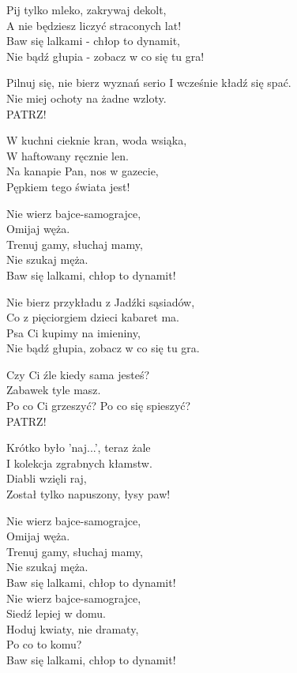 \begin{text}
    Pij tylko mleko, zakrywaj dekolt,\\
    A nie będziesz liczyć straconych lat!\\
    Baw się lalkami - chłop to dynamit,\\
    Nie bądź głupia - zobacz w co się tu gra!

    Pilnuj się, nie bierz wyznań serio
    I wcześnie kładź się spać.\\
    Nie miej ochoty na żadne wzloty.\\
    PATRZ!

    W kuchni cieknie kran, woda wsiąka,\\
    W haftowany ręcznie len.\\
    Na kanapie Pan, nos w gazecie,\\
    Pępkiem tego świata jest!

    \vin Nie wierz bajce-samograjce,\\
    \vin Omijaj węża.\\
    \vin Trenuj gamy, słuchaj mamy,\\
    \vin Nie szukaj męża.\\
    \vin Baw się lalkami, chłop to dynamit!

    Nie bierz przykładu z Jadźki sąsiadów,\\
    Co z pięciorgiem dzieci kabaret ma.\\
    Psa Ci kupimy na imieniny,\\
    Nie bądź głupia, zobacz w co się tu gra.

    Czy Ci źle kiedy sama jesteś?\\
    Zabawek tyle masz.\\
    Po co Ci grzeszyć? Po co się spieszyć?\\
    PATRZ!

    Krótko było 'naj...', teraz żale\\
    I kolekcja zgrabnych kłamstw.\\
    Diabli wzięli raj,\\
    Został tylko napuszony, łysy paw!

    \vin Nie wierz bajce-samograjce,\\
    \vin Omijaj węża.\\
    \vin Trenuj gamy, słuchaj mamy,\\
    \vin Nie szukaj męża.\\
    \vin Baw się lalkami, chłop to dynamit!\\
    \vin Nie wierz bajce-samograjce,\\
    \vin Siedź lepiej w domu.\\
    \vin Hoduj kwiaty, nie dramaty,\\
    \vin Po co to komu?\\
    \vin Baw się lalkami, chłop to dynamit!
\end{text}
\begin{chord}

\end{chord}